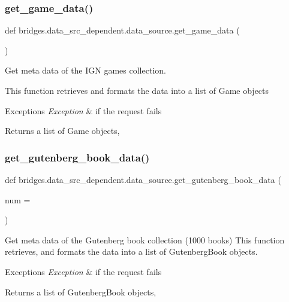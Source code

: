 \subsubsection{\texorpdfstring{get\_game\_data()}{get\_game\_data()}}
{\footnotesize\ttfamily def bridges.\+data\+\_\+src\+\_\+dependent.\+data\+\_\+source.\+get\+\_\+game\+\_\+data (\begin{DoxyParamCaption}{ }\end{DoxyParamCaption})}



Get meta data of the I\+GN games collection. 

This function retrieves and formats the data into a list of Game objects


\begin{DoxyExceptions}{Exceptions}
{\em Exception} & if the request fails\\
\hline
\end{DoxyExceptions}
\begin{DoxyReturn}{Returns}
a list of Game objects, 
\end{DoxyReturn}
\mbox{\label{namespacebridges_1_1data__src__dependent_1_1data__source_af377da50c8f4e488b832978908274089}} 
\subsubsection{\texorpdfstring{get\_gutenberg\_book\_data()}{get\_gutenberg\_book\_data()}}
{\footnotesize\ttfamily def bridges.\+data\+\_\+src\+\_\+dependent.\+data\+\_\+source.\+get\+\_\+gutenberg\+\_\+book\+\_\+data (\begin{DoxyParamCaption}\item[{}]{num = {} }\end{DoxyParamCaption})}



Get meta data of the Gutenberg book collection (1000 books) This function retrieves, and formats the data into a list of Gutenberg\+Book objects. 


\begin{DoxyExceptions}{Exceptions}
{\em Exception} & if the request fails\\
\hline
\end{DoxyExceptions}
\begin{DoxyReturn}{Returns}
a list of Gutenberg\+Book objects, 
\end{DoxyReturn}
\mbox{\label{namespacebridges_1_1data__src__dependent_1_1data__source_ae33c7ed8751b98e913b4485c0b124ed3}} 
